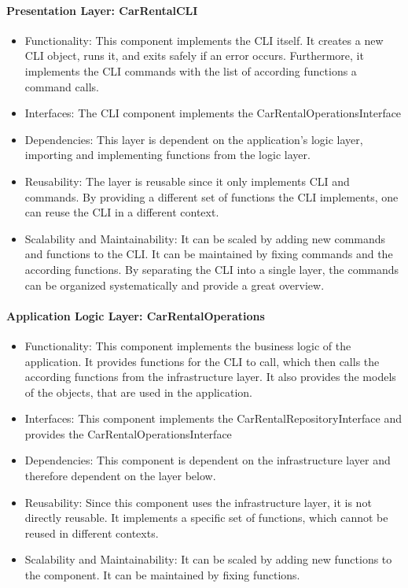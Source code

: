 \paragraph*{Presentation Layer: CarRentalCLI}
\begin{itemize}
    \item Functionality: This component implements the CLI itself. 
          It creates a new CLI object, runs it, and exits safely if an error occurs.
          Furthermore, it implements the CLI commands with the list of according functions a command calls.
    \item Interfaces: The CLI component implements the CarRentalOperationsInterface
    \item Dependencies: This layer is dependent on the application's logic layer, importing and implementing functions from the logic layer.
    \item Reusability: The layer is reusable since it only implements CLI and commands.
          By providing a different set of functions the CLI implements, one can reuse the CLI in a different context.
    \item Scalability and Maintainability: It can be scaled by adding new commands and functions to the CLI.
          It can be maintained by fixing commands and the according functions.
          By separating the CLI into a single layer, the commands can be organized systematically and provide a great overview.
\end{itemize}

\paragraph*{Application Logic Layer: CarRentalOperations}
\begin{itemize}
    \item Functionality: This component implements the business logic of the application.
          It provides functions for the CLI to call, which then calls the according functions from the infrastructure layer.
          It also provides the models of the objects, that are used in the application.
    \item Interfaces: This component implements the CarRentalRepositoryInterface and provides the CarRentalOperationsInterface
    \item Dependencies: This component is dependent on the infrastructure layer and therefore dependent on the layer below.
    \item Reusability: Since this component uses the infrastructure layer, it is not directly reusable.
          It implements a specific set of functions, which cannot be reused in different contexts.
    \item Scalability and Maintainability: It can be scaled by adding new functions to the component.
          It can be maintained by fixing functions.
\end{itemize}

